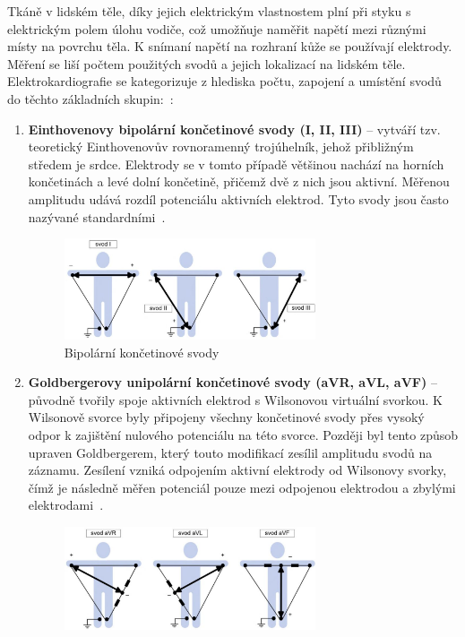 Tkáně v lidském těle, díky jejich elektrickým vlastnostem plní při styku s
elektrickým polem úlohu vodiče, což umožňuje naměřit napětí mezi různými místy
na povrchu těla. K snímaní napětí na rozhraní kůže se používají elektrody.
Měření se liší počtem použitých svodů a jejich lokalizací na lidském těle.
Elektrokardiografie se kategorizuje z hlediska počtu, zapojení a umístění svodů
do těchto základních skupin:~\cite{Haberl2012,Kittnar2020}:
\begin{enumerate}
	\item \textbf{Einthovenovy bipolární končetinové svody (I, II, III)} --
	      vytváří tzv. teoretický Einthovenovův rovnoramenný trojúhelník, jehož
	      přibližným středem je srdce. Elektrody se v tomto případě většinou
	      nachází na horních končetinách a levé dolní končetině, přičemž dvě z
	      nich jsou aktivní. Měřenou amplitudu udává rozdíl potenciálu
	      aktivních elektrod. Tyto svody jsou často nazývané
	      standardními~\cite{Kittnar2020}.
	      \begin{figure}[h]
		      \begin{center}
			      \includegraphics[width=0.7\textwidth]{../assets/anatomy/bipolar}
			      \caption{Bipolární končetinové svody~\cite{Kittnar2020}}
			      \label{fig:bipolar}
		      \end{center}
	      \end{figure}
	\item \textbf{Goldbergerovy unipolární končetinové svody (aVR, aVL, aVF)} --
	      původně tvořily spoje aktivních elektrod s Wilsonovou virtuální
	      svorkou. K Wilsonově svorce byly připojeny všechny končetinové svody
	      přes vysoký odpor k zajištění nulového potenciálu na této svorce.
	      Později byl tento způsob upraven Goldbergerem, který touto modifikací
	      zesílil amplitudu svodů na záznamu. Zesílení vzniká odpojením aktivní
	      elektrody od Wilsonovy svorky, čímž je následně měřen potenciál pouze
	      mezi odpojenou elektrodou a zbylými elektrodami~\cite{Kittnar2020}.
	      \begin{figure}[H]
		      \begin{center}
			      \includegraphics[width=0.7\textwidth]{../assets/anatomy/unipolar1}

\end{center}
\end{figure}
\end{enumerate}
